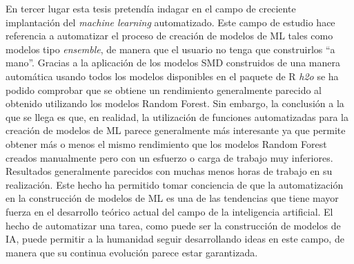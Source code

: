 \documentclass[]{DissertateUSU}
\begin{document}
\noindent En tercer lugar esta tesis pretendía indagar en el campo de
creciente implantación del \emph{machine learning} automatizado. Este
campo de estudio hace referencia a automatizar el proceso de creación de
modelos de ML tales como modelos tipo \emph{ensemble}, de manera que el
usuario no tenga que construirlos ``a mano''. Gracias a la aplicación de
los modelos SMD construidos de una manera automática usando todos los
modelos disponibles en el paquete de R \emph{h2o} se ha podido comprobar
que se obtiene un rendimiento generalmente parecido al obtenido
utilizando los modelos Random Forest. Sin embargo, la conclusión a la
que se llega es que, en realidad, la utilización de funciones
automatizadas para la creación de modelos de ML parece generalmente más
interesante ya que permite obtener más o menos el mismo rendimiento que
los modelos Random Forest creados manualmente pero con un esfuerzo o
carga de trabajo muy inferiores. Resultados generalmente parecidos con
muchas menos horas de trabajo en su realización. Este hecho ha permitido
tomar conciencia de que la automatización en la construcción de modelos
de ML es una de las tendencias que tiene mayor fuerza en el desarrollo
teórico actual del campo de la inteligencia artificial. El hecho de
automatizar una tarea, como puede ser la construcción de modelos de IA,
puede permitir a la humanidad seguir desarrollando ideas en este campo,
de manera que su continua evolución parece estar garantizada.
\end{document}
